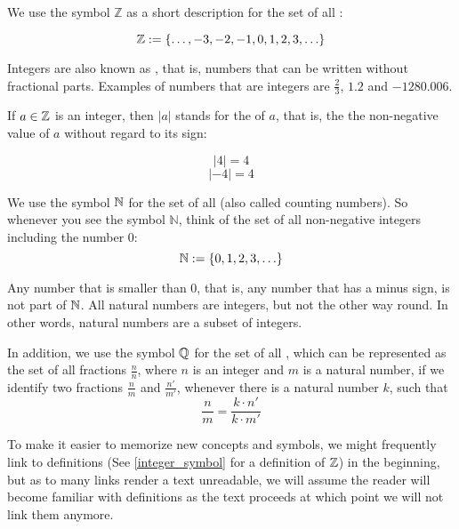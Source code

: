We use the symbol $\mathbb{Z}$ as a short description for the set of all :

\begin{equation}
\label{integer_symbol}
\mathbb{Z} := \{\ldots, -3,-2,-1,0,1,2,3,\ldots\}
\end{equation}

Integers are also known as , that is, numbers that can be written without fractional parts. Examples of numbers that are  integers are $\frac{2}{3}$, $1.2$ and $-1280.006$.

If $a\in \mathbb{Z}$ is an integer, then $|a|$ stands for the  of $a$, that is, the the non-negative value of $a$ without regard to its sign:

\begin{equation}
|4|= 4 
\end{equation}
\begin{equation}
|-4|= 4 
\end{equation}

We use the symbol $\mathbb{N}$ for the set of all  (also called counting numbers). So whenever you see the symbol $\mathbb{N}$, think of the set of all non-negative integers including the number $0$:
\begin{equation}
\label{natural_symbol}
\mathbb{N} := \{0,1,2,3,\ldots\}
\end{equation}

Any number that is smaller than $0$, that is, any number that has a minus sign, is not part of $\mathbb{N}$. All natural numbers are integers, but not the other way round. In other words, natural numbers are a subset of integers.

In addition, we use the symbol $\mathbb{Q}$ for the set of all , which can be represented as the set of all fractions $\frac{n}{n}$, where $n$ is an integer and $m$ is a natural number, if we identify two fractions $\frac{n}{m}$ and $\frac{n'}{m'}$, whenever there is a natural number $k$, such that 
\begin{equation}
\frac{n}{m} = \frac{k\cdot n'}{k\cdot m'}
\end{equation}

To make it easier to memorize new concepts and symbols, we might frequently link to definitions (See \ref{integer_symbol} for a definition of $\mathbb{Z}$) in the beginning, but as to many links render a text unreadable, we will assume the reader will become familiar with definitions as the text proceeds at which point we will not link them anymore.

